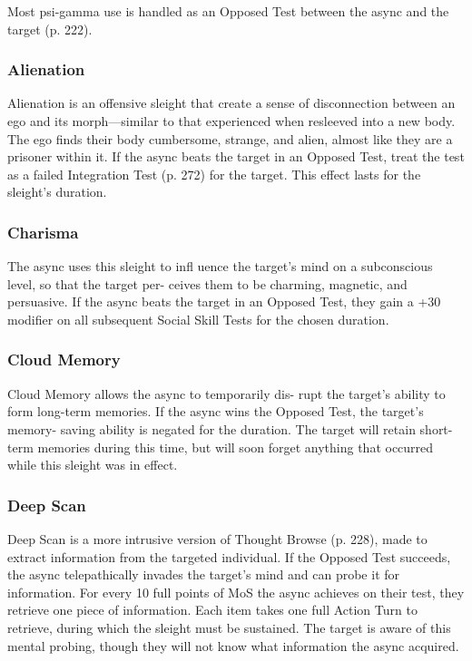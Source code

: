 Most psi-gamma use is handled as an Opposed Test 
between the async and the target (p. 222).

\subsubsection{Alienation}

Alienation is an offensive sleight that create a sense of 
disconnection between an ego and its morph—similar 
to that experienced when resleeved into a new body. 
The ego finds their body cumbersome, strange, and 
alien, almost like they are a prisoner within it. If the 
async beats the target in an Opposed Test, treat the 
test as a failed Integration Test (p. 272) for the target. 
This effect lasts for the sleight's duration.

\subsubsection{Charisma}

The async uses this sleight to infl uence the target's 
mind on a subconscious level, so that the target per-
ceives them to be charming, magnetic, and persuasive. 
If the async beats the target in an Opposed Test, they 
gain a +30 modifier on all subsequent Social Skill 
Tests for the chosen duration.

\subsubsection{Cloud Memory}

Cloud Memory allows the async to temporarily dis-
rupt the target's ability to form long-term memories. If 
the async wins the Opposed Test, the target's memory-
saving ability is negated for the duration. The target 
will retain short-term memories during this time, but 
will soon forget anything that occurred while this 
sleight was in effect.

\subsubsection{Deep Scan}

Deep Scan is a more intrusive version of Thought 
Browse (p. 228), made to extract information from the 
targeted individual. If the Opposed Test succeeds, the 
async telepathically invades the target's mind and can 
probe it for information. For every 10 full points of MoS 
the async achieves on their test, they retrieve one piece 
of information. Each item takes one full Action Turn to 
retrieve, during which the sleight must be sustained. The 
target is aware of this mental probing, though they will 
not know what information the async acquired.

